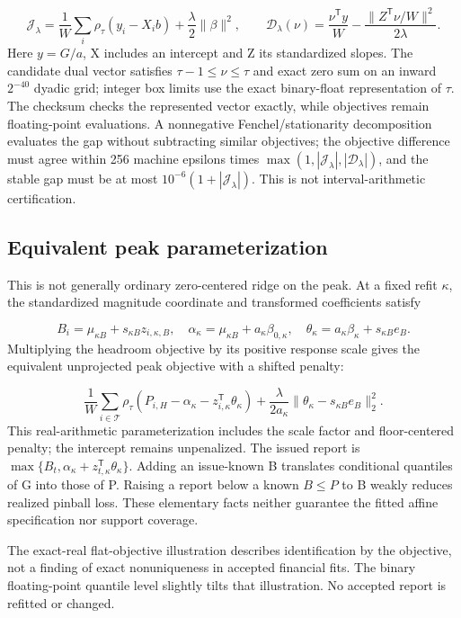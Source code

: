 \documentclass[11pt,a4paper]{article}
\begin{document}
\[
\mathcal J_\lambda=\frac1W\sum_i\rho_\tau(y_i-X_i b)+\frac\lambda2\|\beta\|^2,\qquad\mathcal D_\lambda(\nu)=\frac{\nu^{\mathsf T}y}{W}-\frac{\|Z^{\mathsf T}\nu/W\|^2}{2\lambda}.
\]
Here \(y=G/a\), X includes an intercept and Z its standardized slopes. The candidate dual vector satisfies \(\tau-1\le\nu\le\tau\) and exact zero sum on an inward \(2^{-40}\) dyadic grid; integer box limits use the exact binary-float representation of \(\tau\). The checksum checks the represented vector exactly, while objectives remain floating-point evaluations. A nonnegative Fenchel/stationarity decomposition evaluates the gap without subtracting similar objectives; the objective difference must agree within 256 machine epsilons times \(\max(1,|\mathcal J_\lambda|,|\mathcal D_\lambda|)\), and the stable gap must be at most \(10^{-6}(1+|\mathcal J_\lambda|)\). This is not interval-arithmetic certification.

\subsection*{Equivalent peak parameterization}
This is not generally ordinary zero-centered ridge on the peak. At a fixed refit \(\kappa\), the standardized magnitude coordinate and transformed coefficients satisfy

\[
B_i=\mu_{\kappa B}+s_{\kappa B}z_{i,\kappa,B},\quad\alpha_\kappa=\mu_{\kappa B}+a_\kappa\beta_{0,\kappa},\quad\theta_\kappa=a_\kappa\beta_\kappa+s_{\kappa B}e_B.
\]
Multiplying the headroom objective by its positive response scale gives the equivalent unprojected peak objective with a shifted penalty:

\[
\frac1W\sum_{i\in\mathcal T}\rho_\tau(P_{i,H}-\alpha_\kappa-z_{i,\kappa}^{\mathsf T}\theta_\kappa)+\frac{\lambda}{2a_\kappa}\|\theta_\kappa-s_{\kappa B}e_B\|_2^2.
\]
This real-arithmetic parameterization includes the scale factor and floor-centered penalty; the intercept remains unpenalized. The issued report is \(\max\{B_t,\alpha_\kappa+z_{t,\kappa}^{\mathsf T}\theta_\kappa\}\). Adding an issue-known B translates conditional quantiles of G into those of P. Raising a report below a known \(B\le P\) to B weakly reduces realized pinball loss. These elementary facts neither guarantee the fitted affine specification nor support coverage.

The exact-real flat-objective illustration describes identification by the objective, not a finding of exact nonuniqueness in accepted financial fits. The binary floating-point quantile level slightly tilts that illustration. No accepted report is refitted or changed.
\end{document}

